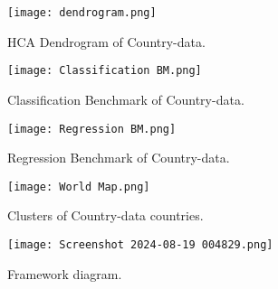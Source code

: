 \documentclass{article}
\begin{document}
\begin{figure}[h] %
    \centering
    \texttt{[image: dendrogram.png]} %
    \caption{HCA Dendrogram of Country-data.} %
    \label{fig:mi-imagen} %
\end{figure}

\begin{figure}[h] %
    \centering
    \texttt{[image: Classification BM.png]} %
    \caption{Classification Benchmark of Country-data.} %
    \label{fig:mi-imagen} %
\end{figure}

\begin{figure}[h] %
    \centering
    \texttt{[image: Regression BM.png]} %
    \caption{Regression Benchmark of Country-data.} %
    \label{fig:mi-imagen} %
\end{figure}

\begin{figure}[h] %
    \centering
    \texttt{[image: World Map.png]} %
    \caption{Clusters of Country-data countries.} %
    \label{fig:mi-imagen} %
\end{figure}

\begin{figure}[h] %
    \centering
    \texttt{[image: Screenshot 2024-08-19 004829.png]} %
    \caption{Framework diagram.} %
    \label{fig:mi-imagen} %
\end{figure}
\end{document}
